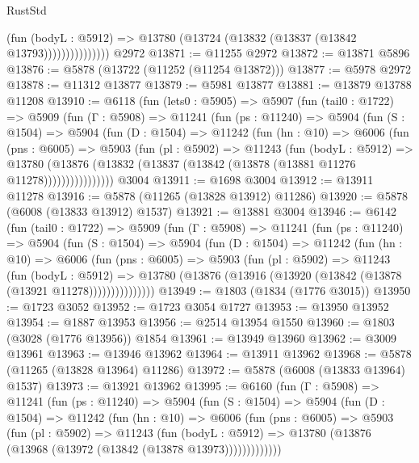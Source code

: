 \begin{lexlean}{RustStd}
\begin{coremodule}
                        (fun (bodyL : @5912) =>
                        @13780 (@13724 (@13832 (@13837 (@13842 @13793)))))))))))))))
    @2972
@13871 := @11255 @2972
@13872 := @13871 @5896
@13876 := @5878 (@13722 (@11252 (@11254 @13872)))
@13877 := @5978 @2972
@13878 := @11312 @13877
@13879 := @5981 @13877
@13881 := @13879 @13788 @11208
@13910 := @6118
    (fun (lets0 : @5905) =>
    @5907
      (fun (tail0 : @1722) =>
      @5909
        (fun (Γ : @5908) =>
        @11241
          (fun (ps : @11240) =>
          @5904
            (fun (S : @1504) =>
            @5904
              (fun (D : @1504) =>
              @11242
                (fun (hn : @10) =>
                @6006
                  (fun (pns : @6005) =>
                  @5903
                    (fun (pl : @5902) =>
                    @11243
                      (fun (bodyL : @5912) =>
                      @13780
                        (@13876
                          (@13832 (@13837 (@13842 (@13878 (@13881 @11276 @11278))))))))))))))))
    @3004
@13911 := @1698 @3004
@13912 := @13911 @11278
@13916 := @5878 (@11265 (@13828 @13912) @11286)
@13920 := @5878 (@6008 (@13833 @13912) @1537)
@13921 := @13881 @3004
@13946 := @6142
    (fun (tail0 : @1722) =>
    @5909
      (fun (Γ : @5908) =>
      @11241
        (fun (ps : @11240) =>
        @5904
          (fun (S : @1504) =>
          @5904
            (fun (D : @1504) =>
            @11242
              (fun (hn : @10) =>
              @6006
                (fun (pns : @6005) =>
                @5903
                  (fun (pl : @5902) =>
                  @11243
                    (fun (bodyL : @5912) =>
                    @13780 (@13876 (@13916 (@13920 (@13842 (@13878 (@13921 @11278)))))))))))))))
@13949 := @1803 (@1834 (@1776 @3015))
@13950 := @1723 @3052
@13952 := @1723 @3054 @1727
@13953 := @13950 @13952
@13954 := @1887 @13953
@13956 := @2514 @13954 @1550
@13960 := @1803 (@3028 (@1776 @13956)) @1854
@13961 := @13949 @13960
@13962 := @3009 @13961
@13963 := @13946 @13962
@13964 := @13911 @13962
@13968 := @5878 (@11265 (@13828 @13964) @11286)
@13972 := @5878 (@6008 (@13833 @13964) @1537)
@13973 := @13921 @13962
@13995 := @6160
    (fun (Γ : @5908) =>
    @11241
      (fun (ps : @11240) =>
      @5904
        (fun (S : @1504) =>
        @5904
          (fun (D : @1504) =>
          @11242
            (fun (hn : @10) =>
            @6006
              (fun (pns : @6005) =>
              @5903
                (fun (pl : @5902) =>
                @11243
                  (fun (bodyL : @5912) =>
                  @13780 (@13876 (@13968 (@13972 (@13842 (@13878 @13973)))))))))))))

\end{coremodule}
\end{lexlean}
